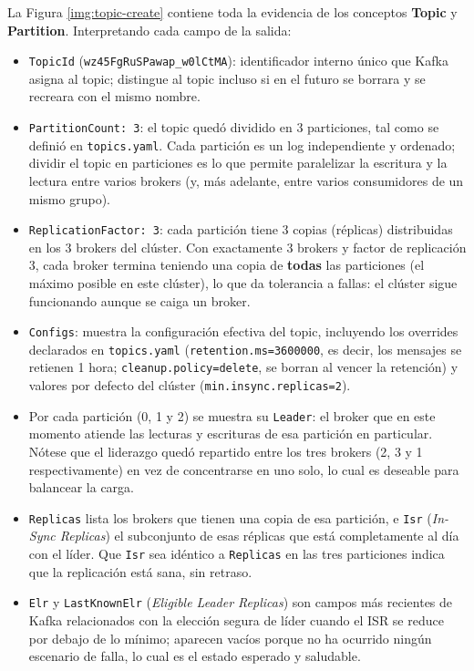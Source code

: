		La Figura \ref{img:topic-create} contiene toda la evidencia de los conceptos \textbf{Topic} y \textbf{Partition}. Interpretando cada campo de la salida:

		\begin{itemize}
			\item \texttt{TopicId} (\texttt{wz45FgRuSPawap\_w0lCtMA}): identificador interno único que Kafka asigna al topic; distingue al topic incluso si en el futuro se borrara y se recreara con el mismo nombre.
			\item \texttt{PartitionCount: 3}: el topic quedó dividido en 3 particiones, tal como se definió en \texttt{topics.yaml}. Cada partición es un log independiente y ordenado; dividir el topic en particiones es lo que permite paralelizar la escritura y la lectura entre varios brokers (y, más adelante, entre varios consumidores de un mismo grupo).
			\item \texttt{ReplicationFactor: 3}: cada partición tiene 3 copias (réplicas) distribuidas en los 3 brokers del clúster. Con exactamente 3 brokers y factor de replicación 3, cada broker termina teniendo una copia de \textbf{todas} las particiones (el máximo posible en este clúster), lo que da tolerancia a fallas: el clúster sigue funcionando aunque se caiga un broker.
			\item \texttt{Configs}: muestra la configuración efectiva del topic, incluyendo los overrides declarados en \texttt{topics.yaml} (\texttt{retention.ms=3600000}, es decir, los mensajes se retienen 1 hora; \texttt{cleanup.policy=delete}, se borran al vencer la retención) y valores por defecto del clúster (\texttt{min.insync.replicas=2}).
			\item Por cada partición (0, 1 y 2) se muestra su \texttt{Leader}: el broker que en este momento atiende las lecturas y escrituras de esa partición en particular. Nótese que el liderazgo quedó repartido entre los tres brokers (2, 3 y 1 respectivamente) en vez de concentrarse en uno solo, lo cual es deseable para balancear la carga.
			\item \texttt{Replicas} lista los brokers que tienen una copia de esa partición, e \texttt{Isr} (\textit{In-Sync Replicas}) el subconjunto de esas réplicas que está completamente al día con el líder. Que \texttt{Isr} sea idéntico a \texttt{Replicas} en las tres particiones indica que la replicación está sana, sin retraso.
			\item \texttt{Elr} y \texttt{LastKnownElr} (\textit{Eligible Leader Replicas}) son campos más recientes de Kafka relacionados con la elección segura de líder cuando el ISR se reduce por debajo de lo mínimo; aparecen vacíos porque no ha ocurrido ningún escenario de falla, lo cual es el estado esperado y saludable.
		\end{itemize}

